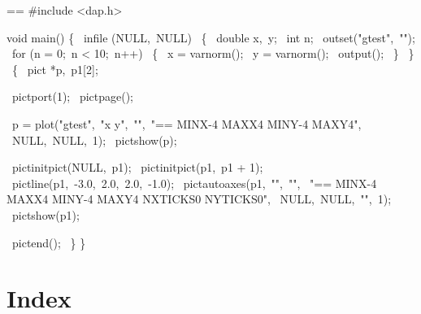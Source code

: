 \documentclass{book}
\makeatletter
\newenvironment{Texinfopreformatted}{%
  \par\GNUTobeylines\obeyspaces\frenchspacing\parskip=\z@\parindent=\z@}{}
{\catcode`\^^M=13 \gdef\GNUTobeylines{\catcode`\^^M=13 \def^^M{\null\par}}}
\newenvironment{Texinfoindented}{\begin{list}{}{}\item\relax}{\end{list}}
\renewcommand{\_}{\Texinfounderscore\discretionary{}{}{}}
\makeatother
\begin{document}
\begin{Texinfoindented}
\begin{Texinfopreformatted}%
\ttfamily 
\#include <dap.h>

void main()
\{
\  infile (NULL,\ NULL)
\    \{
\      double x,\ y;
\      int n;
\      outset("gtest",\ "");
\      for (n = 0;\ n < 10;\ n++)
\        \{
\          x = varnorm();
\          y = varnorm();
\          output();
\        \}
\    \}
\  \{
\    pict *p,\ p1[2];

\    pict\_port(1);
\    pict\_page();

\    p = plot("gtest",\ "x y",\ "",\ "== MINX-4 MAXX4 MINY-4 MAXY4",
\             NULL,\ NULL,\ 1);
\    pict\_show(p);

\    pict\_initpict(NULL,\ p1);
\    pict\_initpict(p1,\ p1 + 1);
\    pict\_line(p1,\ -3.0,\ 2.0,\ 2.0,\ -1.0);
\    pict\_autoaxes(p1,\ "",\ "",
\                  "== MINX-4 MAXX4 MINY-4 MAXY4 NXTICKS0 NYTICKS0",
\                  NULL,\ NULL,\ "",\ 1);
\    pict\_show(p1);

\    pict\_end();
\  \}
\}

\end{Texinfopreformatted}
\end{Texinfoindented}

\chapter*{{Index}}
\label{anchor:Index}%

\printindex[in]
\end{document}
